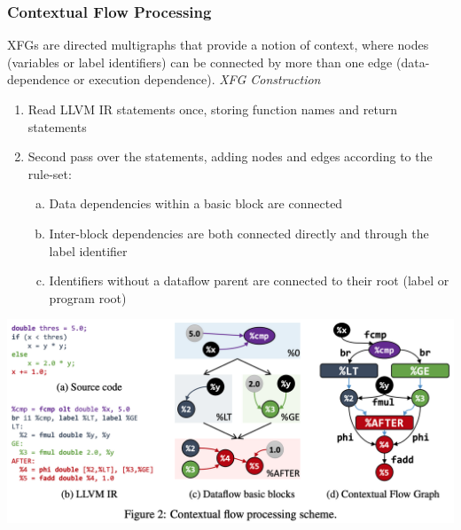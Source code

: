 \documentclass{article}
\begin{document}
\subsubsection{Contextual Flow Processing}
XFGs are directed multigraphs that provide a notion of context, where nodes (variables or label identifiers) can be connected by more than one edge (data-dependence or execution dependence). 
\textit{XFG Construction}
\begin{enumerate}
    \item Read LLVM IR statements once, storing function names and return statements
    \item Second pass over the statements, adding nodes and edges according to the rule-set:
        \begin{enumerate}[(a)]
            \item Data dependencies within a basic block are connected
            \item Inter-block dependencies are both connected directly and through the label identifier 
            \item Identifiers without a dataflow parent are connected to their root (label or program root)
        \end{enumerate}
\end{enumerate}
\centerline{\includegraphics[width=\columnwidth]{Images/Similarity4-2.png}}
\end{document}
